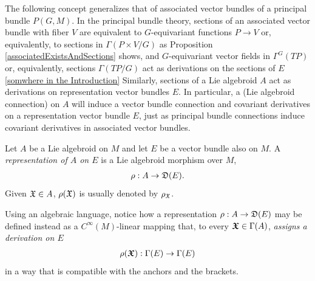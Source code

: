 

\linea

The following concept generalizes that of associated vector bundles of a principal bundle $P(G, M)$. In the principal bundle theory, sections of an associated vector bundle with fiber $V$ are equivalent to $G$-equivariant functions $P \to V$ or, equivalently, to sections in $\Gamma(P \times V/G)$ as Proposition \ref{associatedExistsAndSections} shows, and $G$-equivariant vector fields in $\Gamma^G(TP)$ or, equivalently, sections $\Gamma(TP/G)$ act as derivations on the sections of $E$ \ref{somwhere in the Introduction}%
Similarly, sections of a Lie algebroid $A$ act as derivations on representation vector bundles $E$. In particular, a (Lie algebroid connection) on $A$ will induce a vector bundle connection and covariant derivatives on a representation vector bundle $E$, just as principal bundle connections induce covariant derivatives in associated vector bundles.

\begin{definition}\label{defnRepr}
Let $A$ be a Lie algebroid on $M$ and let $E$ be a vector bundle also on $M$. A \emph{representation of $A$ on $E$} is a Lie algebroid morphism over $M$,
\begin{align}
    \rho: A \to \mathfrak{D}(E).
\end{align}
Given $\mathfrak{X} \in A$, $\rho(\mathfrak{X})$ is usually denoted by $\rho_{\mathfrak{X}}$.
\end{definition}
Using an algebraic language, notice how a representation $\rho:A \to \mathfrak{D}(E)$ may be defined instead as a $C^\infty(M)$-linear mapping that, to every $\bm{\mathfrak{X}} \in \Gamma(A)$, \emph{assigns a derivation on $E$} 
\begin{align}
    \rho(\bm{\mathfrak{X}}): \Gamma(E) \to \Gamma(E)
\end{align}
in a way that is compatible with the anchors and the brackets.

